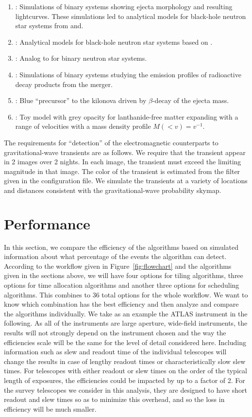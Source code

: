 \documentclass[twocolumn]{aastex62}
\begin{document}
\begin{enumerate}
\item \cite{TaHo2014}: Simulations of binary systems showing ejecta morphology and resulting lightcurves. These simulations led to analytical models for black-hole neutron star systems from \cite{KaKy2016} and\cite{DiUj2017}.
\item \cite{KaKy2016}: Analytical models for black-hole neutron star systems based on \cite{TaHo2014}.
\item \cite{DiUj2017}: Analog to \cite{KaKy2016} for binary neutron star systems.
\item \cite{BaKa2016}: Simulations of binary systems studying the emission profiles of radioactive decay products from the merger.
\item \cite{MeBa2015}: Blue ``precursor'' to the kilonova driven by $\beta$-decay of the ejecta mass.
\item \cite{Me2017}: Toy model with grey opacity for lanthanide-free matter expanding with a range of velocities with a mass density profile $M(< v) = v^{-1}$.
\end{enumerate}

The requirements for ``detection'' of the electromagnetic counterparts to gravitational-wave transients are as follows.
We require that the transient appear in 2 images over 2 nights.
In each image, the transient must exceed the limiting magnitude in that image.
The color of the transient is estimated from the filter given in the configuration file.
We simulate the transients at a variety of locations and distances consistent with the gravitational-wave probability skymap.


\section{Performance}
\label{sec:performance}
In this section, we compare the efficiency of the algorithms based on simulated information about what percentage of the events the algorithm can detect. According to the workflow given in Figure~\ref{fig:flowchart} and the algorithms given in the sections above, we will have four options for tiling algorithms, three options for time allocation algorithms and another three options for scheduling algorithms. This combines to 36 total options for the whole workflow. We want to know which combination has the best efficiency and then analyze and compare the algorithms individually.
We take as an example the ATLAS instrument in the following. 
As all of the instruments are large aperture, wide-field instruments, the results will not strongly depend on the instrument chosen and the way the efficiencies scale will be the same for the level of detail considered here.
Including information such as slew and readout time of the individual telescopes will change the results in case of lengthy readout times or characteristically slow slew times.
For telescopes with either readout or slew times on the order of the typical length of exposures, the efficiencies could be impacted by up to a factor of 2.
For the survey telescopes we consider in this analysis, they are designed to have short readout and slew times so as to minimize this overhead, and so the loss in efficiency will be much smaller.
\end{document}
